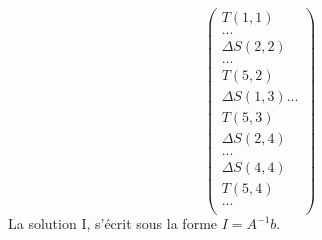 \begin{equation}
\begin{pmatrix}
T(1,1)\\
...\\
\Delta S(2,2)\\
...\\
T(5,2)\\
\Delta S(1,3)
...\\
T(5,3)\\
\Delta S(2,4)\\
...\\
\Delta S(4,4)\\
T(5,4)\\
...\\
\end{pmatrix}
\end{equation}
La solution I, s'écrit sous la forme $I = A^{-1} b$.

